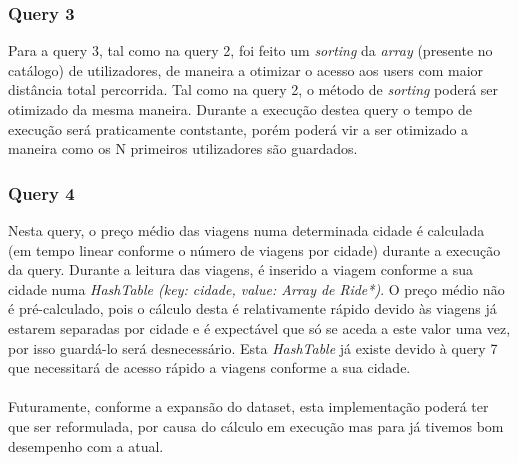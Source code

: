 \documentclass{article}
\begin{document}
        \subsubsection{Query 3}
            Para a query 3, tal como na query 2, foi feito um \emph{sorting} da
            \emph{array} (presente no catálogo) de utilizadores, de maneira a 
            otimizar o acesso aos users com maior distância total percorrida.
            Tal como na query 2, o método de \emph{sorting} poderá ser otimizado
            da mesma maneira.
            Durante a execução destea query o tempo de execução será praticamente
            contstante, porém poderá vir a ser otimizado a maneira como os N
            primeiros utilizadores são guardados.        
        \subsubsection{Query 4}
            Nesta query, o preço médio das viagens numa determinada cidade é 
            calculada (em tempo linear conforme o número de viagens por cidade)
            durante a execução da query. Durante a leitura das viagens,
            é inserido a viagem conforme a sua cidade numa 
            \emph{HashTable (key: cidade, value: Array de Ride*)}. 
            O preço médio não é pré-calculado, pois o cálculo desta é 
            relativamente rápido devido às viagens já estarem separadas por cidade
            e é expectável que só se aceda a este valor uma vez, por isso
            guardá-lo será desnecessário.
            Esta \emph{HashTable} já existe devido à query 7 que necessitará de
            acesso rápido a viagens conforme a sua cidade. 
            \\
            \\Futuramente, conforme a expansão do dataset, esta implementação 
            poderá ter que ser reformulada, por causa do cálculo em execução mas
            para já tivemos bom desempenho com a atual.
        
\end{document}
